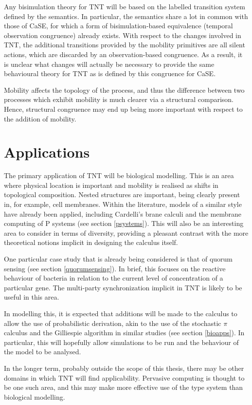 Any bisimulation theory for TNT will be based on the labelled transition
system defined by the semantics.  In particular, the semantics share a
lot in common with those of CaSE, for which a form of bisimulation-based
equivalence (temporal observation congruence) already exists.  With
respect to the changes involved in TNT, the additional transitions
provided by the mobility primitives are all silent actions, which are
discarded by an observation-based congruence.  As a result, it is
unclear what changes will actually be necessary to provide the same
behavioural theory for TNT as is defined by this congruence for CaSE.

Mobility affects the topology of the process, and thus the difference
between two processes which exhibit mobility is much clearer via a
structural comparison.  Hence, structural congruence may end up being
more important with respect to the addition of mobility.

\section{Applications}
\label{futureapp}

The primary application of TNT will be biological modelling.  This is an
area where physical location is important and mobility is realised as
shifts in topological composition.  Nested structures are important,
being clearly present in, for example, cell membranes.  Within the
literature, models of a similar style have already been applied,
including Cardelli's brane calculi \cite{brane04} and the membrane
computing of P systems (see section \ref{psystems}).  This will also be
an interesting area to consider in terms of diversity, providing a
pleasant contrast with the more theoretical notions implicit in
designing the calculus itself.

One particular case study that is already being considered is that of
quorum sensing (see section \ref{quorumsensing}).  In brief, this
focuses on the reactive behaviour of bacteria in relation to the current
level of concentration of a particular gene.  The multi-party
synchronization implicit in TNT is likely to be useful in this area.

In modelling this, it is expected that additions will be made to the
calculus to allow the use of probabilistic derivation, akin to the use
of the stochastic $\pi$ calculus and the Gilliespie algorithm in similar
studies (see section \ref{bioapps}).  In particular, this will hopefully
allow simulations to be run and the behaviour of the model to be
analysed.

In the longer term, probably outside the scope of this thesis, there may
be other domains in which TNT will find applicability.  Pervasive
computing is thought to be one such area, and this may make more
effective use of the type system than biological modelling.